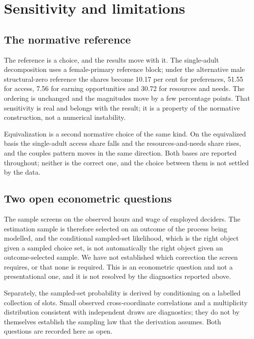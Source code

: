 \section{Sensitivity and limitations}\label{sensitivity-and-limitations}

\subsection{The normative reference}\label{the-normative-reference}

The reference is a choice, and the results move with it. The single-adult decomposition uses a female-primary reference block; under the alternative male structural-zero reference the shares become 10.17 per cent for preferences, 51.55 for access, 7.56 for earning opportunities and 30.72 for resources and needs. The ordering is unchanged and the magnitudes move by a few percentage points. That sensitivity is real and belongs with the result; it is a property of the normative construction, not a numerical instability.

Equivalization is a second normative choice of the same kind. On the equivalized basis the single-adult access share falls and the resources-and-needs share rises, and the couples pattern moves in the same direction. Both bases are reported throughout; neither is the correct one, and the choice between them is not settled by the data.

\subsection{Two open econometric questions}\label{two-open-econometric-questions}

The sample screens on the observed hours and wage of employed deciders. The estimation sample is therefore selected on an outcome of the process being modelled, and the conditional sampled-set likelihood, which is the right object given a sampled choice set, is not automatically the right object given an outcome-selected sample. We have not established which correction the screen requires, or that none is required. This is an econometric question and not a presentational one, and it is not resolved by the diagnostics reported above.

Separately, the sampled-set probability is derived by conditioning on a labelled collection of slots. Small observed cross-coordinate correlations and a multiplicity distribution consistent with independent draws are diagnostics; they do not by themselves establish the sampling law that the derivation assumes. Both questions are recorded here as open.

